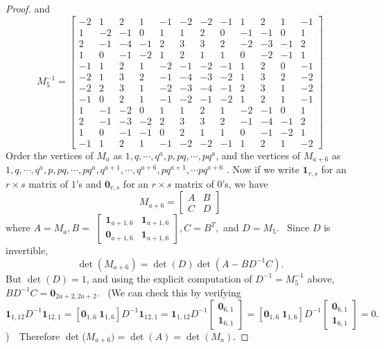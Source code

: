 \documentclass[11pt,a4paper]{amsart}
\theoremstyle{definition}
\numberwithin{equation}{section}
\begin{document}
\begin{proof}
and  
\[
M_{5}^{-1}=\left[ 
\begin{array}{cccccccccccc}
-2 & 1 & 2 & 1 & -1 & -2 & -2 & -1 & 1 & 2 & 1 & -1 \\ 
1 & -2 & -1 & 0 & 1 & 1 & 2 & 0 & -1 & -1 & 0 & 1 \\ 
2 & -1 & -4 & -1 & 2 & 3 & 3 & 2 & -2 & -3 & -1 & 2 \\ 
1 & 0 & -1 & -2 & 1 & 2 & 1 & 1 & 0 & -2 & -1 & 1 \\ 
-1 & 1 & 2 & 1 & -2 & -1 & -2 & -1 & 1 & 2 & 0 & -1 \\ 
-2 & 1 & 3 & 2 & -1 & -4 & -3 & -2 & 1 & 3 & 2 & -2 \\ 
-2 & 2 & 3 & 1 & -2 & -3 & -4 & -1 & 2 & 3 & 1 & -2 \\ 
-1 & 0 & 2 & 1 & -1 & -2 & -1 & -2 & 1 & 2 & 1 & -1 \\ 
1 & -1 & -2 & 0 & 1 & 1 & 2 & 1 & -2 & -1 & 0 & 1 \\ 
2 & -1 & -3 & -2 & 2 & 3 & 3 & 2 & -1 & -4 & -1 & 2 \\ 
1 & 0 & -1 & -1 & 0 & 2 & 1 & 1 & 0 & -1 & -2 & 1 \\ 
-1 & 1 & 2 & 1 & -1 & -2 & -2 & -1 & 1 & 2 & 1 & -2%
\end{array}%
\right] 
\]%
Order the vertices of $M_{a}$ as $1,q,\cdots ,q^{a},p,pq,\cdots ,pq^{a}$,
and the vertices of $M_{a+6}$ as \newline $1,q,\cdots ,q^{a},p,pq,\cdots
,pq^{a},q^{a+1},\cdots ,q^{a+6},pq^{a+1},\cdots pq^{a+6}$ . Now if we write $%
\mathbf{1}_{r,s}$ for an $r\times s$ matrix of $1$'s and $\mathbf{0}_{r,s}$
for an $r\times s$ matrix of $0$'s, we have 
\[
M_{a+6}=\left[ 
\begin{array}{cc}
A & B \\ 
C & D%
\end{array}%
\right] 
\]%
where $A=M_{a},B=$ $\left[ 
\begin{array}{cc}
\mathbf{1}_{a+1,6} & \mathbf{1}_{a+1,6} \\ 
\mathbf{0}_{a+1,6} & \mathbf{1}_{a+1,6}%
\end{array}%
\right] ,C=B^{T},$ and $D=M_{5}$. \ Since $D$ is invertible, 
\[
\det (M_{a+6})=\det (D)\det (A-BD^{-1}C).
\]%
But $\det (D)=1$, and using the explicit computation of $D^{-1}=M_{5}^{-1}$
above, $BD^{-1}C=\mathbf{0}_{2a+2,2a+2}$. \ (We can check this by verifying $%
\mathbf{1}_{1,12}D^{-1}\mathbf{1}_{12,1}=[\mathbf{0}_{1,6}\ \mathbf{1}%
_{1,6}]D^{-1}\mathbf{1}_{12,1}=\mathbf{1}_{1,12}D^{-1}\left[ 
\begin{array}{c}
\mathbf{0}_{6,1} \\ 
\mathbf{1}_{6,1}%
\end{array}%
\right] =[\mathbf{0}_{1,6}\ \mathbf{1}_{1,6}]D^{-1}\left[ 
\begin{array}{c}
\mathbf{0}_{6,1} \\ 
\mathbf{1}_{6,1}%
\end{array}%
\right] =0.$)\ \ Therefore $\det $($M_{a+6})=\det (A)=\det (M_{a})$.
\end{proof}
\end{document}

